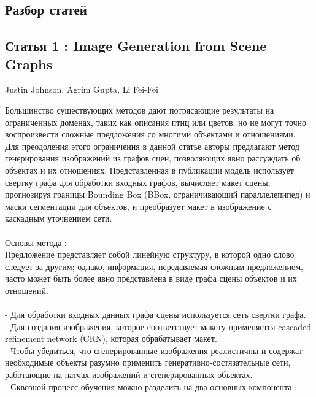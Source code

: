 \documentclass{article}
\begin{document}
    \newpage
    \begin{center} 
    \section{Разбор статей}
    \subsection{Статья 1 : Image Generation from Scene Graphs}
      \huge Justin Johnson, Agrim Gupta, Li Fei-Fei\\ [1.3cm]
    \end{center} 
      \large Большинство существующих методов дают потрясающие результаты на ограниченных доменах, таких
как описания птиц или цветов, но не могут точно воспроизвести
сложные предложения со многими объектами и отношениями.\\
Для преодоления этого ограничения в данной статье авторы предлагают метод
генерирования изображений из графов сцен, позволяющих явно рассуждать об
объектах и их отношениях. Представленная в публикации модель использует свертку графа для
обработки входных графов, вычисляет макет сцены, прогнозируя границы
Bounding Box (BBox, ограничивающий параллелепипед) и маски сегментации для объектов, и преобразует макет в
изображение с каскадным уточнением сети.\\ \\
Основы метода :\\
Предложение представляет собой линейную структуру, в которой одно слово следует за другим; однако,
информация, передаваемая сложным предложением, часто может быть более явно представлена в виде графа сцены
объектов и их отношений.\\ \\
 - Для обработки входных данных графа сцены используется сеть свертки графа.\\
 - Для создания изображения, которое соответствует макету применяется cascaded refinement network (CRN), которая
обрабатывает макет.\\
 - Чтобы убедиться, что сгенерированные изображения реалистичны и содержат необходимые объекты разумно применить
генеративно-состязательные сети, работающие на патчах изображений и сгенерированных объектах.\\
 - Сквозной процесс обучения можно разделить на два основных компонента :\\ 
\end{document}
